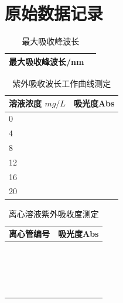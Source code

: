 \documentclass[a4paper]{article}
\begin{document}
\section{原始数据记录}
\begin{table}[H]
	\caption{最大吸收峰波长}
	\begin{center}
		\begin{tabular}{l|l}
			\hline
			最大吸收峰波长/nm& \quad\quad\quad\quad\quad\quad\quad\quad\\
			\hline
		 \end{tabular}
	\end{center}
\end{table}
\begin{table}[H]
	\caption{紫外吸收波长工作曲线测定}
	\begin{center}
		\begin{tabular}{l|l}
			\hline
			溶液浓度 $mg/L$\quad\quad\quad\quad & 吸光度Abs\quad\quad\quad\quad\\
			\hline
			0&\\
			\hline
			4&\\
			\hline
			8&\\
			\hline
			12&\\
			\hline
			16&\\
			\hline
			20&\\
			\hline
		 \end{tabular}
	\end{center}
\end{table}
\begin{table}[H]
	\caption{离心溶液紫外吸收度测定}
	\begin{center}
		\begin{tabular}{l|l}
			\hline
			离心管编号\quad\quad\quad\quad & 吸光度Abs\quad\quad\quad\quad\\
			\hline
			&\\
			\hline
			&\\
			\hline
			&\\
			\hline
			&\\
			\hline
			&\\
			\hline
			&\\
			\hline
			&\\
			\hline
			&\\
			\hline
			&\\
			\hline
			&\\
			\hline
			&\\
			\hline
			&\\
			\hline
			&\\
			\hline
			&\\
			\hline
			&\\
			\hline
			&\\
			\hline
			&\\
			\hline
			&\\
			\hline
		 \end{tabular}
	\end{center}
\end{table}
\end{document}
